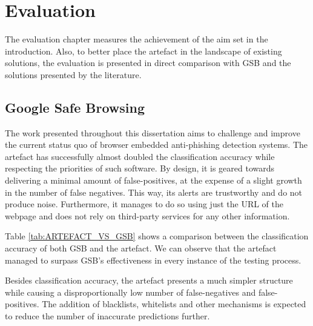 \chapter{Evaluation}
The evaluation chapter measures the achievement of the aim set in the introduction. Also, to better place the artefact in the landscape of existing solutions, the evaluation is presented in direct comparison with GSB and the solutions presented by the literature.

\section{Google Safe Browsing}
The work presented throughout this dissertation aims to challenge and improve the current status quo of browser embedded anti-phishing detection systems. The artefact has successfully almost doubled the classification accuracy while respecting the priorities of such software. By design, it is geared towards delivering a minimal amount of false-positives, at the expense of a slight growth in the number of false negatives. This way, its alerts are trustworthy and do not produce noise. Furthermore, it manages to do so using just the URL of the webpage and does not rely on third-party services for any other information.

Table \ref{tab:ARTEFACT_VS_GSB} shows a comparison between the classification accuracy of both GSB and the artefact. We can observe that the artefact managed to surpass GSB's effectiveness in every instance of the testing process.

Besides classification accuracy, the artefact presents a much simpler structure while causing a disproportionally low number of false-negatives and false-positives. The addition of blacklists, whitelists and other mechanisms is expected to reduce the number of inaccurate predictions further.

